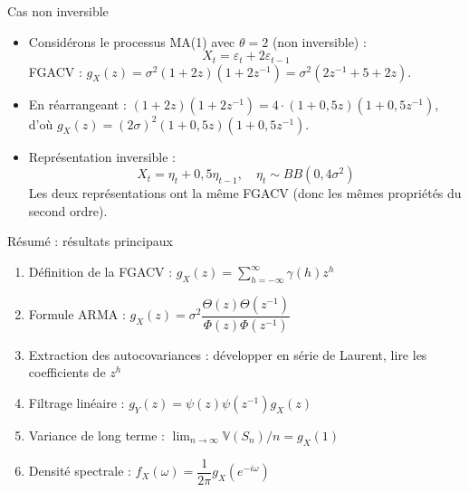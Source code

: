 \documentclass[11pt,aspectratio=169]{beamer}
\newcommand{\Var}{\mathbb{V}}
\begin{document}
\begin{frame}{Cas non inversible}

\begin{itemize}

\item Considérons le processus MA(1) avec $\theta = 2$ (non inversible) :
  \[
  X_t = \varepsilon_t + 2\varepsilon_{t-1}
  \]
  FGACV : $g_X(z) = \sigma^2(1+2z)(1+2z^{-1}) = \sigma^2(2z^{-1} + 5 + 2z)$.\newline

\item En réarrangeant : $(1+2z)(1+2z^{-1}) = 4 \cdot (1+0{,}5z)(1+0{,}5z^{-1})$, d'où $g_X(z) = (2\sigma)^2 (1+0{,}5z)(1+0{,}5z^{-1})$.\newline

\item Représentation inversible :
  \[
  X_t = \eta_t + 0{,}5\eta_{t-1}, \quad \eta_t \sim BB(0, 4\sigma^2)
  \]
  Les deux représentations ont la même FGACV (donc les mêmes propriétés du second ordre).

\end{itemize}

\end{frame}


\begin{frame}{Résumé : résultats principaux}

\begin{enumerate}

\item Définition de la FGACV : $g_X(z) = \sum_{h=-\infty}^{\infty} \gamma(h) z^h$\newline

\item Formule ARMA : $g_X(z) = \sigma^2 \dfrac{\Theta(z)\Theta(z^{-1})}{\Phi(z)\Phi(z^{-1})}$\newline

\item Extraction des autocovariances : développer en série de Laurent, lire les coefficients de $z^h$\newline

\item Filtrage linéaire : $g_Y(z) = \psi(z)\psi(z^{-1})g_X(z)$\newline

\item Variance de long terme : $\lim_{n\to\infty} \Var(S_n)/n = g_X(1)$\newline

\item Densité spectrale : $f_X(\omega) = \dfrac{1}{2\pi}g_X(e^{-i\omega})$

\end{enumerate}

\end{frame}
\end{document}
